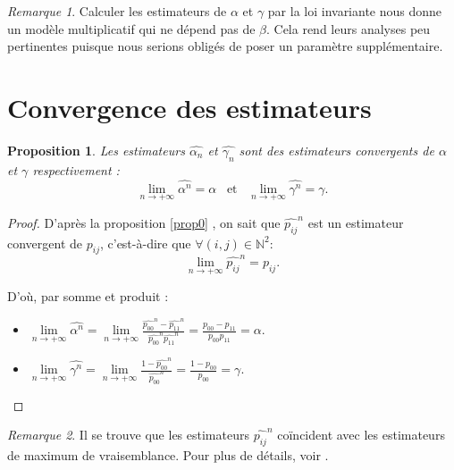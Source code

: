 \documentclass[12pt,a4paper]{report}
\newtheorem{prop}[thm]{Proposition}
\theoremstyle{remark}
\newtheorem*{remark}{Remarque}
\begin{document}
\begin{remark}
Calculer les estimateurs de $\alpha$ et $\gamma$ par la loi invariante nous donne un modèle multiplicatif qui ne dépend pas de $\beta$. Cela rend leurs analyses peu pertinentes puisque nous serions obligés de poser un paramètre supplémentaire.
\end{remark}

\section{Convergence des estimateurs}

\vspace{0.6cm}
\begin{prop}\label{prop_conv}
Les estimateurs $\hat{\alpha_n}$ et $\hat{\gamma_n}$ sont des estimateurs convergents de $\alpha$ et $\gamma$ respectivement  :
$$\lim\limits_{n \to +\infty}\hat{\alpha^n} =\alpha \, \, \, \text{ et } \, \, \, \lim\limits_{n \to +\infty}\hat{\gamma^n} =\gamma.$$
\end{prop}

\begin{proof}
D'après la proposition \ref{prop0} , on sait que $\hat{p_{ij}}^n$ est un estimateur convergent de $p_{ij}$, c'est-à-dire que $\forall (i,j) \in \mathbb{N}^2$:
$$\lim\limits_{n \to +\infty}\hat{p_{ij}}^n = p_{ij}.$$

D'où, par somme et produit : \\
\begin{itemize}
    \item $\lim\limits_{n \to +\infty}\hat{\alpha^n} =\lim\limits_{n \to +\infty}\frac{\hat{p_{00}}^n-\hat{p_{11}}^n}{\hat{p_{00}}^n\hat{p_{11}}^n} = \frac{p_{00}-p_{11}}{p_{00}p_{11}} = \alpha .$\\
    \item $\lim\limits_{n \to +\infty}\hat{\gamma^n} = \lim\limits_{n \to +\infty}\frac{1-\hat{p_{00}}^n}{\hat{p_{00}}^n} =\frac{1-p_{00}}{p_{00}}= \gamma .$
\end{itemize}
\end{proof}

\begin{remark}
Il se trouve que les estimateurs $\hat{p_{ij}}^n$ coïncident avec les estimateurs de maximum de vraisemblance. Pour plus de détails, voir \cite{cle4}.
\end{remark}
\end{document}
